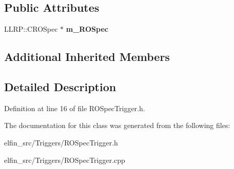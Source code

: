 \subsection*{Public Attributes}
\begin{DoxyCompactItemize}
\item 
\hypertarget{class_e_l_f_i_n_1_1_r_o_spec_trigger_aa381a1f7f2fb0346f15695019e5beea0}{L\-L\-R\-P\-::\-C\-R\-O\-Spec $\ast$ {\bfseries m\-\_\-\-R\-O\-Spec}}\label{class_e_l_f_i_n_1_1_r_o_spec_trigger_aa381a1f7f2fb0346f15695019e5beea0}

\end{DoxyCompactItemize}
\subsection*{Additional Inherited Members}


\subsection{Detailed Description}


Definition at line 16 of file R\-O\-Spec\-Trigger.\-h.



The documentation for this class was generated from the following files\-:\begin{DoxyCompactItemize}
\item 
elfin\-\_\-src/\-Triggers/R\-O\-Spec\-Trigger.\-h\item 
elfin\-\_\-src/\-Triggers/R\-O\-Spec\-Trigger.\-cpp\end{DoxyCompactItemize}
